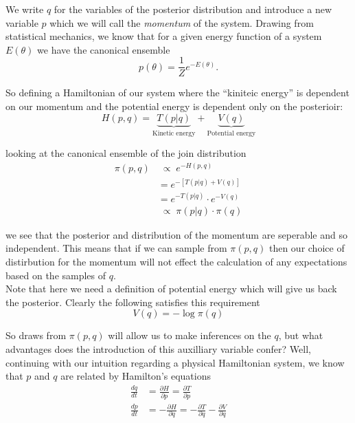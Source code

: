 \documentclass{article}
\begin{document}
We write $q$ for the variables of the posterior distribution and introduce a new variable $p$ which we will call the \emph{momentum} of the system. Drawing from statistical mechanics, we know that for a given energy function of a system $E(\theta)$ we have the canonical ensemble
\begin{equation}
  p(\theta) = \frac{1}{Z} e^{-E(\theta)}.
\end{equation}

So defining a Hamiltonian of our system where the ``kiniteic energy'' is dependent on our momentum and the potential energy is dependent only on the posterioir:
\begin{equation}
  H(p, q) = \underbrace{T(p|q)}_{\text{Kinetic energy}} + \underbrace{V(q)}_{\text{Potential energy}}
\end{equation} 

looking at the canonical ensemble of the join distribution
\begin{align}
  \pi(p, q) &\;{\propto} \; e^{-H(p, q)} \\
          &= e^{-[T(p|q) + V(q)]} \\
          &= e^{-T(p|q)} \cdot e^{-V(q)} \\
          &\;{\propto} \; \pi(p|q) \cdot \pi(q) 
\end{align}

we see that the posterior and distribution of the momentum are seperable and so independent. This means that if we can sample from $\pi(p, q)$ then our choice of distirbution for the momentum will not effect the calculation of any expectations based on the samples of $q$. \\

Note that here we need a definition of potential energy which will give us back the posterior. Clearly the following satisfies this requirement
\begin{equation}
  V(q) = - \log \pi(q)
\end{equation}

So draws from $\pi(p, q)$ will allow us to make inferences on the $q$, but what advantages does the introduction of this auxilliary variable confer? Well, continuing with our intuition regarding a physical Hamiltonian system, we know that $p$ and $q$ are related by Hamilton's equations
\begin{align}
\frac{dq}{dt} &= \frac{\partial H}{\partial p} = \frac{\partial T}{\partial p} \\
\frac{dp}{dt} &= - \frac{\partial H}{\partial q} = - \frac{\partial T}{\partial q} - \frac{\partial V}{\partial q}
\end{align}
\end{document}
